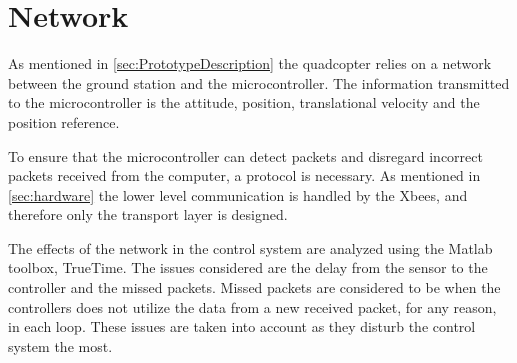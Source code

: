\chapter{Network} \label{ch:Network}

As mentioned in \autoref{sec:PrototypeDescription} the quadcopter relies on a network between the ground station and the microcontroller. The information transmitted to the microcontroller is the attitude, position, translational velocity and the position reference.

To ensure that the microcontroller can detect packets and disregard incorrect packets received from the computer, a protocol is necessary. As mentioned in \autoref{sec:hardware} the lower level communication is handled by the Xbees, and therefore only the transport layer is designed.


The effects of the network in the control system are analyzed using the Matlab toolbox, TrueTime. The issues considered are the delay from the sensor to the controller and the missed packets. Missed packets are considered to be when the controllers does not utilize the data from a new received packet, for any reason, in each loop. These issues are taken into account as they disturb the control system the most.

